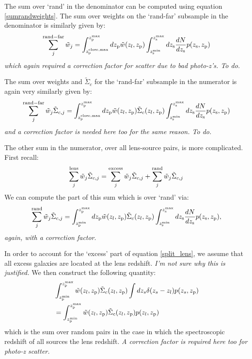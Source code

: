 \documentclass[onecolumn,amsmath,aps,fleqn, superscriptaddress]{revtex4}
\begin{document}
The sum over `rand' in the denominator can be computed using equation \ref{sumrandweights}. The sum over weights on the `rand-far' subsample in the denominator is similarly given by:
\begin{equation}
\sum\limits_{j}^{\rm rand-far} \tilde{w}_j = \int_{z_{\rm p}^{\rm close,max}}^{z_{\rm p}^{\rm max}} d z_{\rm p} \tilde{w}(z_l, z_{\rm p}) \int_{z_{\rm s}^{\rm min}}^{z_{\rm s}^{\rm max}} dz_{\rm s} \frac{dN}{dz_{\rm s}} p(z_{\rm s}, z_{\rm p})
\label{sumrandfarweights}
\end{equation}
{\it which again required a correction factor for scatter due to bad photo-z's. To do.}

The sum over weights and $\tilde{\Sigma}_{c}$ for the `rand-far' subsample in the numerator is again very similarly given by:
\begin{equation}
\sum\limits_{j}^{\rm rand-far} \tilde{w}_j \tilde{\Sigma}_{c,j} = \int_{z_{\rm p}^{\rm close,max}}^{z_{\rm p}^{\rm max}} d z_{\rm p} \tilde{w}(z_l, z_{\rm p})\tilde{\Sigma}_c(z_l, z_{\rm p}) \int_{z_{\rm s}^{\rm min}}^{z_{\rm s}^{\rm max}} dz_{\rm s} \frac{dN}{dz_{\rm s}} p(z_{\rm s}, z_{\rm p})
\label{sumrandfarweightsSigC}
\end{equation}
{\it and a correction factor is needed here too for the same reason. To do.}

The other sum in the numerator, over all lens-source pairs, is more complicated. First recall:
\begin{equation}
\sum\limits_{j}^{\rm lens} \tilde{w}_j \tilde{\Sigma}_{c,j} = \sum\limits_{j}^{\rm excess} \tilde{w}_j \tilde{\Sigma}_{c,j} + \sum\limits_{j}^{\rm rand} \tilde{w}_j \tilde{\Sigma}_{c,j}
\label{split_lens}
\end{equation}
 We can compute the part of this sum which is over `rand' via:
 \begin{equation}
\sum\limits_{j}^{\rm rand} \tilde{w}_j \tilde{\Sigma}_{c,j} = \int_{z_{\rm p}^{\rm min}}^{z_{\rm p}^{\rm max}} d z_{\rm p} \tilde{w}(z_l, z_{\rm p})\tilde{\Sigma}_c(z_l, z_{\rm p}) \int_{z_{\rm s}^{\rm min}}^{z_{\rm s}^{\rm max}} dz_{\rm s} \frac{dN}{dz_{\rm s}} p(z_{\rm s}, z_{\rm p}),
\label{sumrandweightsSigC}
\end{equation}
{\it again, with a correction factor}.

In order to account for the `excess' part of equation \ref{split_lens}, we assume that all excess galaxies are located at the lens redshift. {\it I'm not sure why this is justified.} We then construct the following quantity:
\begin{align}
&\int_{z_{\rm p}^{\rm min}}^{z_{\rm p}^{\rm max}} \tilde{w}(z_l, z_{\rm p}) \tilde{\Sigma}_c(z_l, z_{\rm p}) \int dz_s \delta(z_s - z_l) p(z_s, z_{\rm p}) \nonumber \\ &= \int_{z_{\rm p}^{\rm min}}^{z_{\rm p}^{\rm max}} \tilde{w}(z_l, z_{\rm p}) \tilde{\Sigma}_c(z_l, z_{\rm p}) p(z_l, z_{\rm p})
\label{rand_atzl}
\end{align}
which is the sum over random pairs in the case in which the spectroscopic redshift of all sources the lens redshift. {\it A correction factor is required here too for photo-z scatter.} 
\end{document}
